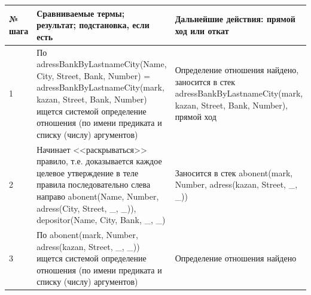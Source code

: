 \documentclass[a4paper,14pt]{extreport} %
\begin{document}
\begin{longtable}{|p{1.1cm}|p{8.5cm}|p{7cm}|}
	\hline
 	№ шага & Сравниваемые термы; результат; подстановка, если есть  & Дальнейшие действия: прямой ход или откат \\ \hline
	1 & По adressBankByLastnameCity(Name, City, Street, Bank, Number) = adressBankByLastnameCity(mark, kazan, Street, Bank, Number) ищется системой определение отношения (по имени предиката и списку (числу) аргументов) & Определение отношения найдено, заносится в стек adressBankByLastnameCity(mark, kazan, Street, Bank, Number), прямой ход \\ \hline
	2 & Начинает <<раскрываться>> правило, т.е. доказывается каждое целевое утверждение в теле правила последовательно слева направо
	abonent(Name, Number, adress(City, Street, \_, \_)), depositor(Name, City, Bank, \_, \_) 
	
	& Заносится в стек abonent(mark, Number, adress(kazan, Street, \_, \_)) \\ \hline
	
	3 & По abonent(mark, Number, adress(kazan, Street, \_, \_))  ищется системой определение отношения (по имени предиката и списку (числу) аргументов) & Определение отношения найдено \\ \hline
	

\end{longtable}
\end{document}
